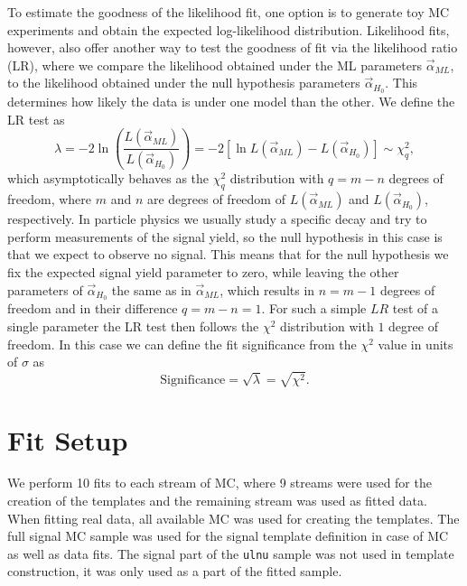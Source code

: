 To estimate the goodness of the likelihood fit, one option is to generate toy MC experiments and obtain the expected log-likelihood distribution. Likelihood fits, however, also offer another way to test the goodness of fit via the likelihood ratio (LR), where we compare the likelihood obtained under the ML parameters $\vec\alpha_{ML}$, to the likelihood obtained under the null hypothesis parameters $\vec\alpha_{H_0}$. This determines how likely the data is under one model than the other. We define the LR test as
\begin{equation}
\label{eq:lr}
\lambda = -2\ln\left(\frac{L(\vec \alpha_{ML})}{L(\vec \alpha_{H_0})}\right) = -2 \left[ \ln L(\vec \alpha_{ML}) - L(\vec \alpha_{H_0})\right] \sim \chi^2_q,
\end{equation}
which asymptotically behaves as the $\chi^2_q$ distribution with $q=m-n$ degrees of freedom, where $m$ and $n$ are degrees of freedom of $L(\vec \alpha_{ML})$ and $L(\vec \alpha_{H_0})$, respectively. In particle physics we usually study a specific decay and try to perform measurements of the signal yield, so the null hypothesis in this case is that we expect to observe no signal. This means that for the null hypothesis we fix the expected signal yield parameter to zero, while leaving the other parameters of $\vec\alpha_{H_0}$ the same as in $\vec\alpha_{ML}$, which results in $n = m-1$ degrees of freedom and in their difference $q = m -n = 1$. For such a simple $LR$ test of a single parameter the LR test then follows the $\chi^2$ distribution with $1$ degree of freedom. In this case we can define the fit significance from the $\chi^2$ value in units of $\sigma$ as
\begin{equation}
\mathrm{Significance} = \sqrt{\lambda} = \sqrt{\chi^2}.
\end{equation}

\section{Fit Setup}
We perform 10 fits to each stream of MC, where 9 streams were used for the creation of the templates and the remaining stream was used as fitted data. When fitting real data, all available MC was used for creating the templates. The full signal MC sample was used for the signal template definition in case of MC as well as data fits. The signal part of the \texttt{ulnu} sample was not used in template construction, it was only used as a part of the fitted sample. 

